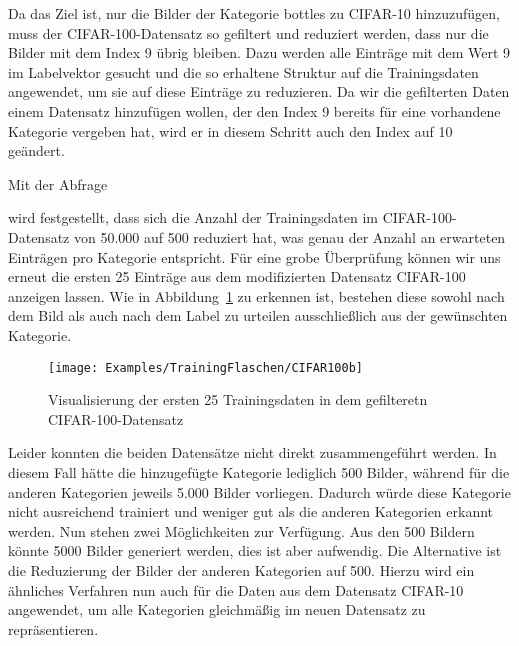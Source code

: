 Da das Ziel ist, nur die Bilder der Kategorie \glqq bottles\grqq{} zu CIFAR-10 hinzuzufügen, muss der CIFAR-100-Datensatz so gefiltert und reduziert werden, dass nur die Bilder mit dem Index 9 übrig bleiben. Dazu werden alle Einträge mit dem Wert 9 im Labelvektor gesucht  und die so erhaltene Struktur auf die Trainingsdaten angewendet, um sie auf diese Einträge zu reduzieren. Da wir die gefilterten  Daten einem Datensatz hinzufügen wollen, der den Index 9 bereits für eine vorhandene Kategorie vergeben hat, wird er in diesem Schritt auch den Index auf 10 geändert.
 
\medskip






\medskip


Mit der Abfrage

\medskip


\medskip


wird festgestellt, dass sich die Anzahl der Trainingsdaten im CIFAR-100-Datensatz von 50.000 auf 500 reduziert hat, was genau der Anzahl an erwarteten Einträgen pro Kategorie entspricht. Für eine grobe Überprüfung können wir uns erneut die ersten 25 Einträge aus dem modifizierten Datensatz CIFAR-100 anzeigen lassen. Wie in Abbildung~\ref{CIF100b} zu erkennen ist, bestehen diese sowohl  nach dem Bild als auch nach dem Label zu urteilen ausschließlich aus der gewünschten Kategorie.
 
 \begin{figure}[H]
	\begin{center}
		\texttt{[image: Examples/TrainingFlaschen/CIFAR100b]}
		\caption{Visualisierung der ersten 25 Trainingsdaten in dem gefilteretn CIFAR-100-Datensatz} 
		\label{CIF100b}
	\end{center}
\end{figure}
 

Leider konnten die beiden Datensätze nicht direkt zusammengeführt werden. In diesem Fall hätte die hinzugefügte Kategorie lediglich 500 Bilder, während für die anderen Kategorien jeweils 5.000 Bilder vorliegen. Dadurch würde diese Kategorie nicht ausreichend trainiert und weniger gut als die anderen Kategorien erkannt werden. Nun stehen zwei Möglichkeiten zur Verfügung. Aus den 500 Bildern könnte 5000 Bilder generiert werden, dies ist aber aufwendig. Die Alternative ist die Reduzierung der Bilder der anderen Kategorien auf 500. Hierzu wird ein ähnliches Verfahren nun auch für die Daten aus dem Datensatz CIFAR-10 angewendet, um alle Kategorien gleichmäßig im neuen Datensatz zu repräsentieren.



